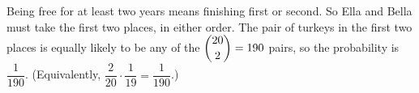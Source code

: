 Being free for at least two years means finishing first or second. So Ella and Bella must take the first two places, in either order. The pair of turkeys in the first two places is equally likely to be any of the $\dbinom{20}{2}=190$ pairs, so the probability is $\boxed{\dfrac{1}{190}}$. (Equivalently, $\dfrac{2}{20}\cdot\dfrac{1}{19}=\dfrac{1}{190}$.)
